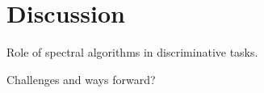 \section{Discussion}
\label{sec:discussion}

Role of spectral algorithms in discriminative tasks.

Challenges and ways forward?

